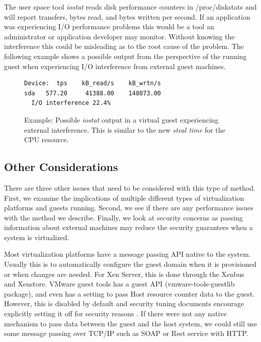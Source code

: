 The user space tool \emph{iostat} reads disk performance counters in /proc/diskstats and will report transfers, bytes read, and bytes written per second.  If an application was experiencing I/O performance problems this would be a tool an administrator or application developer may monitor.  Without knowing the interference this could be misleading as to the root cause of the problem.  The following example shows a possible output from the perspective of the running guest when experiencing I/O interference from external guest machines.

\begin{figure}[h]
\begin{Verbatim}
Device:  tps    kB_read/s    kB_wrtn/s
sda   577.20     41388.00    148073.00
  I/O interference 22.4%     
\end{Verbatim}
\label{fig:iostat}
\caption{Example:  Possible \emph{iostat} output in a virtual guest experiencing external interference.  This is similar to the new \emph{steal time} for the CPU resource.}
\end{figure}

\subsection{Other Considerations}
There are three other issues that need to be considered with this type of method.  First, we examine the implications of multiple different types of virtualization platforms and guests running.  Second, we see if there are any performance issues with the method we describe.  Finally, we look at security concerns as passing information about external machines may reduce the security guarantees when a system is virtualized.

Most virtualization platforms have a message passing API native to the system.  Usually this is to automatically configure the guest domain when it is provisioned or when changes are needed.  For Xen Server, this is done through the Xenbus and Xenstore.  VMware guest tools has a guest API (vmware-tools-guestlib package), and even has a setting to pass Host resource counter data to the guest.  However, this is disabled by default and security tuning documents encourage explicitly setting it off for security reasons \cite{vmwarepubs}.  If there were not any native mechanism to pass data between the guest and the host system, we could still use some message passing over TCP/IP such as SOAP or Rest service with HTTP.


